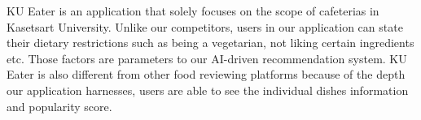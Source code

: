 \par
KU Eater is an application that solely focuses on the scope of cafeterias in Kasetsart University.
Unlike our competitors, users in our application can state their dietary restrictions such as being a vegetarian,
not liking certain ingredients etc. Those factors are parameters to our AI-driven recommendation system.
KU Eater is also different from other food reviewing platforms because of the depth our application harnesses,
users are able to see the individual dishes information and popularity score. 


